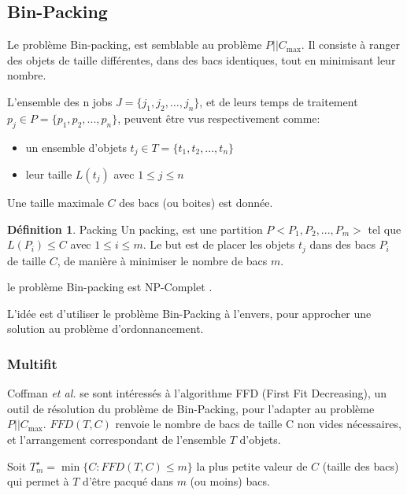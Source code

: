 \documentclass[a4paper,12pt]{report}
\theoremstyle{plain}				%
\theoremstyle{definition}				%
\newtheorem{definition}{Définition} %
\newcommand\problemGrahamP{$P||C_{\max}$\xspace}
\newcommand{\tdi}[1]{\todo[inline]{{#1}}{}}
\newcommand{\lp}[1]{\todo[author=LP,color=yellow,inline]{#1}}
\begin{document}
\subsection{Bin-Packing}

Le problème Bin-packing, est semblable au problème \problemGrahamP.
Il consiste à ranger des objets de taille différentes, dans des bacs
identiques, tout en minimisant leur nombre.

L'ensemble des n jobs $J = \{j_1, j_2, \ldots, j_n\}$, et de leurs temps de
traitement $p_j \in P = \{p_1, p_2, ..., p_n\}$, peuvent être vus
respectivement comme:
\begin{itemize}
\item un ensemble d'objets $t_j \in T = \{t_1, t_2, ..., t_n\}$
\item leur taille $L(t_j)$ avec $1 \le j \le n$
\end{itemize}
Une taille maximale $C$ des bacs (ou boites) est donnée.
\bigskip

\begin{definition}{Packing}
  Un packing, est une partition $P<P_1, P_2, ..., P_m>$ tel que
  $L(P_i) \leq C$ avec $1 \leq i\leq m$.
  Le but est de placer les objets $t_j$ dans des bacs $P_i$ de taille
  $C$, de manière à minimiser le nombre de bacs $m$.
\end{definition}

le problème Bin-packing est NP-Complet \cite{Johnson1974WorstCasePB}.

L'idée est d'utiliser le problème Bin-Packing à l'envers, pour
approcher une solution au problème d'ordonnancement.


\subsubsection{Multifit}

Coffman \emph{et al.} \cite{coffman1978application} se sont
intéressés à l'algorithme FFD (First Fit Decreasing), un outil de
résolution du problème de Bin-Packing, pour l'adapter au problème
\problemGrahamP.
$FFD(T,C)$ renvoie le nombre de bacs de taille C non vides
nécessaires, et l'arrangement correspondant de l'ensemble $T$ d'objets.

\bigskip
Soit $T_m^\star = \min\{C:FFD(T,C) \leq m\}$ la plus petite valeur de
$C$ (taille des bacs) qui permet à $T$ d'être pacqué dans $m$ (ou moins)
bacs.
\end{document}

